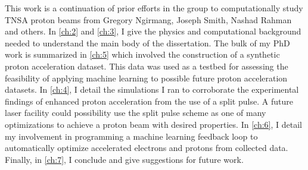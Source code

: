 This work is a continuation of prior efforts in the group to computationally study \gls{TNSA} proton beams from Gregory Ngirmang, Joseph Smith, Nashad Rahman and others. In \autoref{ch:2} and \autoref{ch:3}, I give the physics and computational background needed to understand the main body of the dissertation. The bulk of my PhD work is summarized in \autoref{ch:5} which involved the construction of a synthetic proton acceleration dataset. This data was used as a testbed for assessing the feasibility of applying machine learning to possible future proton acceleration datasets. In \autoref{ch:4}, I detail the simulations I ran to corroborate the experimental findings of enhanced proton acceleration from the use of a split pulse. A future laser facility could possibility use the split pulse scheme as one of many optimizations to achieve a proton beam with desired properties. In \autoref{ch:6}, I detail my involvement in programming a machine learning feedback loop to automatically optimize accelerated electrons and protons from collected data. Finally, in \autoref{ch:7}, I conclude and give suggestions for future work.


